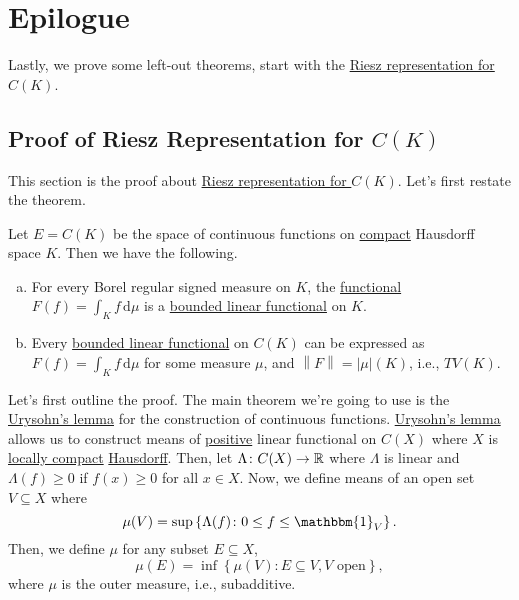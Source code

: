 \chapter{Epilogue}
Lastly, we prove some left-out theorems, start with the \hyperref[thm:Riesz-representation-for-C-K]{Riesz representation for \(C(K)\)}.

\section{Proof of Riesz Representation for \(C(K)\)}\label{pf:Riesz-representation-for-C-K}
This section is the proof about \hyperref[thm:Riesz-representation-for-C-K]{Riesz representation for \(C(K)\)}. Let's first restate the theorem.

\begin{prev}
	Let \(E = C(K)\) be the space of continuous functions on \hyperref[def:compact]{compact} Hausdorff space \(K\). Then we have the following.
	\begin{enumerate}[(a)]
		\item For every Borel regular signed measure on \(K\), the \hyperref[def:linear-functional]{functional} \(F(f) = \int _K f\,\mathrm{d} \mu \) is a \hyperref[def:bounded-linear-functional]{bounded linear functional} on \(K\).
		\item Every \hyperref[def:bounded-linear-functional]{bounded linear functional} on \(C(K)\) can be expressed as \(F(f) = \int _K f\,\mathrm{d} \mu \) for some measure \(\mu \), and \(\left\lVert F\right\rVert = \left\vert \mu  \right\vert (K) \), i.e., \(TV(K)\).
	\end{enumerate}
\end{prev}
Let's first outline the proof. The main theorem we're going to use is the \hyperref[thm:Urysohn-lemma]{Urysohn's lemma} for the construction of continuous functions. \hyperref[thm:Urysohn-lemma]{Urysohn's lemma} allows us to construct means of \hyperref[def:positive-op]{positive} linear functional on \(C(X)\) where \(X\) is \hyperref[def:locally-compact]{locally compact} \hyperref[def:Hausdorff]{Hausdorff}. Then, let \(\Lambda \colon C(X) \to \mathbb{\MakeUppercase{r}} \) where \(\Lambda \) is linear and \(\Lambda (f) \geq 0\) if \(f(x) \geq 0\) for all \(x\in X\). Now, we define means of an open set \(V \subseteq X\) where
\[
	\mu (V) = \sup \left\{ \Lambda (f) \colon 0 \leq f \leq \mathbbm{1}_{V} \right\}.
\]
Then, we define \(\mu \) for any subset \(E \subseteq X\),
\[
	\mu (E) = \inf \left\{ \mu (V)\colon E \subseteq V, V \text{ open}  \right\},
\]
where \(\mu \) is the outer measure, i.e., subadditive.
